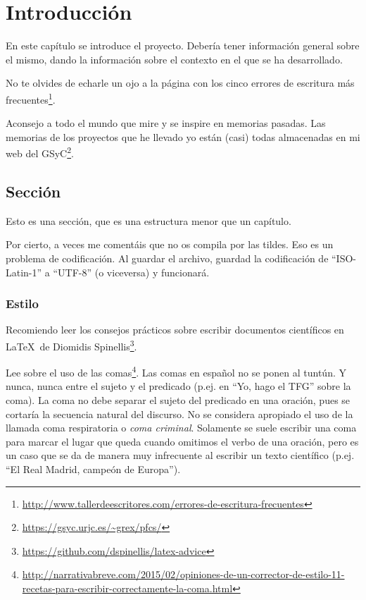 \chapter{Introducción}
\label{sec:intro}

En este capítulo se introduce el proyecto.
Debería tener información general sobre el mismo, dando la información sobre el contexto en el que se ha desarrollado.

No te olvides de echarle un ojo a la página con los cinco errores de escritura más frecuentes\footnote{\url{http://www.tallerdeescritores.com/errores-de-escritura-frecuentes}}.

Aconsejo a todo el mundo que mire y se inspire en memorias pasadas.
Las memorias de los proyectos que he llevado yo están (casi) todas almacenadas en mi web del GSyC\footnote{\url{https://gsyc.urjc.es/~grex/pfcs/}}.

\section{Sección}
\label{sec:seccion}

Esto es una sección, que es una estructura menor que un capítulo. 

Por cierto, a veces me comentáis que no os compila por las tildes.
Eso es un problema de codificación.
Al guardar el archivo, guardad la codificación de ``ISO-Latin-1'' a ``UTF-8'' (o viceversa) y funcionará.

\subsection{Estilo}
\label{subsec:estilo}

Recomiendo leer los consejos prácticos sobre escribir documentos científicos en \LaTeX \ de Diomidis Spinellis\footnote{\url{https://github.com/dspinellis/latex-advice}}.

Lee sobre el uso de las comas\footnote{\url{http://narrativabreve.com/2015/02/opiniones-de-un-corrector-de-estilo-11-recetas-para-escribir-correctamente-la-coma.html}}. 
Las comas en español no se ponen al tuntún.
Y nunca, nunca entre el sujeto y el predicado (p.ej. en ``Yo, hago el TFG'' sobre la coma).
La coma no debe separar el sujeto del predicado en una oración, pues se cortaría la secuencia natural del discurso.
No se considera apropiado el uso de la llamada coma respiratoria o \emph{coma criminal}.
Solamente se suele escribir una coma para marcar el lugar que queda cuando omitimos el verbo de una oración, pero es un caso que se da de manera muy infrecuente al escribir un texto científico (p.ej. ``El Real Madrid, campeón de Europa'').

